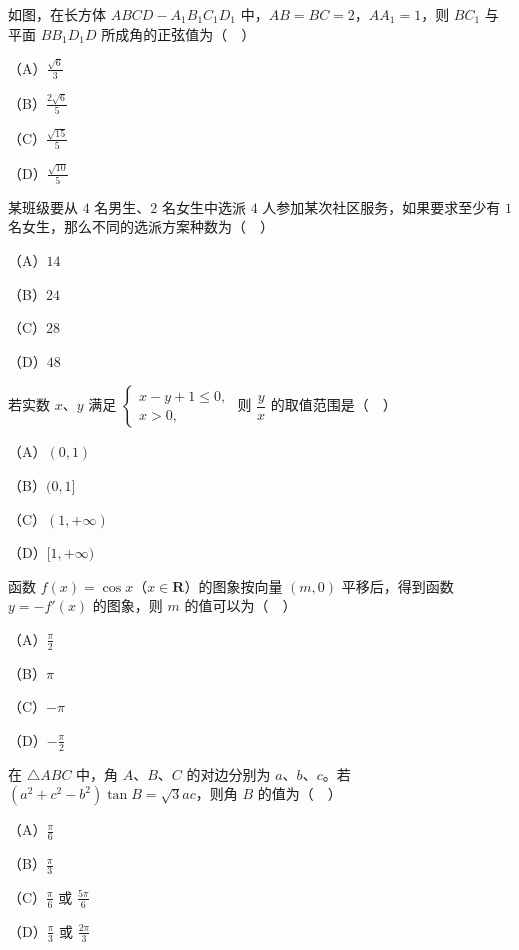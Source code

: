 \begin{question}
如图，在长方体 $ABCD-A_1B_1C_1D_1$ 中，$AB=BC=2$，$AA_1=1$，则 $BC_1$ 与平面 $BB_1D_1D$ 所成角的正弦值为（　）

（A）$\frac{\sqrt6}{3}$

（B）$\frac{2\sqrt6}{5}$

（C）$\frac{\sqrt{15}}{5}$

（D）$\frac{\sqrt{10}}{5}$
\nopagebreak[4]
\begin{center}\end{center}
\nopagebreak[4]
\end{question}
\begin{question}
某班级要从 $4$ 名男生、$2$ 名女生中选派 $4$ 人参加某次社区服务，如果要求至少有 $1$ 名女生，那么不同的选派方案种数为（　）

（A）$14$

（B）$24$

（C）$28$

（D）$48$

\end{question}
\begin{question}
若实数 $x$、$y$ 满足 $\begin{cases}x-y+1\leqslant0,\\ x>0,\end{cases}$ 则 $\dfrac yx$ 的取值范围是（　）

（A）$(0,1)$

（B）$(0,1]$

（C）$(1,+\infty)$

（D）$[1,+\infty)$

\end{question}
\begin{question}
函数 $f(x)=\cos x$（$x\in\mathbf R$）的图象按向量 $(m,0)$ 平移后，得到函数 $y=-f'(x)$ 的图象，则 $m$ 的值可以为（　）

（A）$\frac{\pi}{2}$

（B）$\pi$

（C）$-\pi$

（D）$-\frac{\pi}{2}$

\end{question}
\begin{question}
在 $\triangle ABC$ 中，角 $A$、$B$、$C$ 的对边分别为 $a$、$b$、$c$。若 $(a^2+c^2-b^2)\tan B=\sqrt3ac$，则角 $B$ 的值为（　）

（A）$\frac{\pi}{6}$

（B）$\frac{\pi}{3}$

（C）$\frac{\pi}{6}$ 或 $\frac{5\pi}{6}$

（D）$\frac{\pi}{3}$ 或 $\frac{2\pi}{3}$

\end{question}

